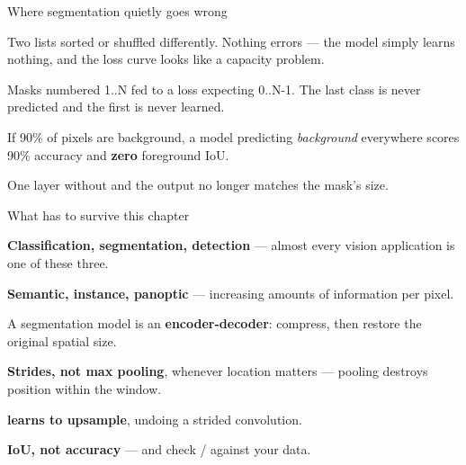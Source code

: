 \documentclass[aspectratio=169,11pt,t]{beamer}
\begin{document}
\begin{frame}[shrink=25]{Where segmentation quietly goes wrong}
\begin{minipage}[t]{0.494\textwidth}
\begin{icardbad}
Two lists sorted or shuffled differently. Nothing errors --- the model simply learns nothing, and the loss curve looks like a capacity problem.
\end{icardbad}
\end{minipage}%
\hfill
\begin{minipage}[t]{0.494\textwidth}
\begin{icardbad}
Masks numbered 1..N fed to a loss expecting 0..N-1. The last class is never predicted and the first is never learned.
\end{icardbad}
\end{minipage}%


\vskip 4pt

\begin{minipage}[t]{0.494\textwidth}
\begin{icardwarn}
If 90\% of pixels are background, a model predicting \textit{background} everywhere scores 90\% accuracy and \textbf{zero} foreground IoU.
\end{icardwarn}
\end{minipage}%
\hfill
\begin{minipage}[t]{0.494\textwidth}
\begin{icardwarn}
One layer without  and the output no longer matches the mask's size.
\end{icardwarn}
\end{minipage}%
\end{frame}

\begin{frame}[shrink=25]{What has to survive this chapter}
\begin{isteps}
\item \textbf{Classification, segmentation, detection} --- almost every vision application is one of these three.
\item \textbf{Semantic, instance, panoptic} --- increasing amounts of information per pixel.
\item A segmentation model is an \textbf{encoder-decoder}: compress, then restore the original spatial size.
\item \textbf{Strides, not max pooling}, whenever location matters --- pooling destroys position within the window.
\item \textbf{ learns to upsample}, undoing a strided convolution.
\item \textbf{IoU, not accuracy} --- and check  /  against your data.
\end{isteps}
\end{frame}
\end{document}

